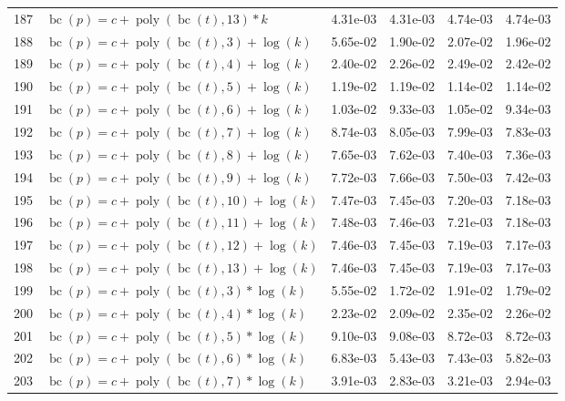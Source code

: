 \documentclass[12pt,a4paper]{article}
\DeclareMathOperator{\bc}{bc}
\DeclareMathOperator{\poly}{poly}
\begin{document}
\begin{longtable}[t]{ll>{\raggedleft\arraybackslash}p{2cm}>{\raggedleft\arraybackslash}p{2cm}>{\raggedleft\arraybackslash}p{2cm}>{\raggedleft\arraybackslash}p{2cm}}
\rowcolor{gray!6}  187 & $\bc(p) = c + \poly\left( \bc(t), 13 \right) * k$ & 4.31e-03 & 4.31e-03 & 4.74e-03 & 4.74e-03\\
188 & $\bc(p) = c + \poly\left( \bc(t), 3 \right) + \log(k)$ & 5.65e-02 & 1.90e-02 & 2.07e-02 & 1.96e-02\\
\rowcolor{gray!6}  189 & $\bc(p) = c + \poly\left( \bc(t), 4 \right) + \log(k)$ & 2.40e-02 & 2.26e-02 & 2.49e-02 & 2.42e-02\\
190 & $\bc(p) = c + \poly\left( \bc(t), 5 \right) + \log(k)$ & 1.19e-02 & 1.19e-02 & 1.14e-02 & 1.14e-02\\
\rowcolor{gray!6}  191 & $\bc(p) = c + \poly\left( \bc(t), 6 \right) + \log(k)$ & 1.03e-02 & 9.33e-03 & 1.05e-02 & 9.34e-03\\
192 & $\bc(p) = c + \poly\left( \bc(t), 7 \right) + \log(k)$ & 8.74e-03 & 8.05e-03 & 7.99e-03 & 7.83e-03\\
\rowcolor{gray!6}  193 & $\bc(p) = c + \poly\left( \bc(t), 8 \right) + \log(k)$ & 7.65e-03 & 7.62e-03 & 7.40e-03 & 7.36e-03\\
194 & $\bc(p) = c + \poly\left( \bc(t), 9 \right) + \log(k)$ & 7.72e-03 & 7.66e-03 & 7.50e-03 & 7.42e-03\\
\rowcolor{gray!6}  195 & $\bc(p) = c + \poly\left( \bc(t), 10 \right) + \log(k)$ & 7.47e-03 & 7.45e-03 & 7.20e-03 & 7.18e-03\\
196 & $\bc(p) = c + \poly\left( \bc(t), 11 \right) + \log(k)$ & 7.48e-03 & 7.46e-03 & 7.21e-03 & 7.18e-03\\
\rowcolor{gray!6}  197 & $\bc(p) = c + \poly\left( \bc(t), 12 \right) + \log(k)$ & 7.46e-03 & 7.45e-03 & 7.19e-03 & 7.17e-03\\
198 & $\bc(p) = c + \poly\left( \bc(t), 13 \right) + \log(k)$ & 7.46e-03 & 7.45e-03 & 7.19e-03 & 7.17e-03\\
\rowcolor{gray!6}  199 & $\bc(p) = c + \poly\left( \bc(t), 3 \right) * \log(k)$ & 5.55e-02 & 1.72e-02 & 1.91e-02 & 1.79e-02\\
200 & $\bc(p) = c + \poly\left( \bc(t), 4 \right) * \log(k)$ & 2.23e-02 & 2.09e-02 & 2.35e-02 & 2.26e-02\\
\rowcolor{gray!6}  201 & $\bc(p) = c + \poly\left( \bc(t), 5 \right) * \log(k)$ & 9.10e-03 & 9.08e-03 & 8.72e-03 & 8.72e-03\\
202 & $\bc(p) = c + \poly\left( \bc(t), 6 \right) * \log(k)$ & 6.83e-03 & 5.43e-03 & 7.43e-03 & 5.82e-03\\
\rowcolor{gray!6}  203 & $\bc(p) = c + \poly\left( \bc(t), 7 \right) * \log(k)$ & 3.91e-03 & 2.83e-03 & 3.21e-03 & 2.94e-03\\

\end{longtable}
\end{document}

